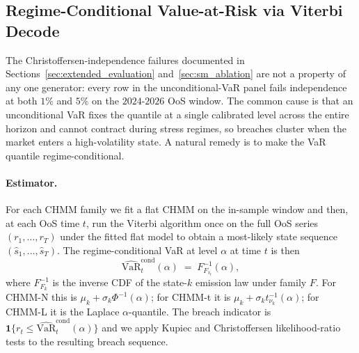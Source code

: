 \subsection{Regime-Conditional Value-at-Risk via Viterbi Decode}
\label{sec:conditional_var}

The Christoffersen-independence failures documented in Sections~\ref{sec:extended_evaluation} and~\ref{sec:sm_ablation} are not a property of any one generator: every row in the unconditional-VaR panel fails independence at both $1\%$ and $5\%$ on the $2024$-$2026$ OoS window.
The common cause is that an unconditional VaR fixes the quantile at a single calibrated level across the entire horizon and cannot contract during stress regimes, so breaches cluster when the market enters a high-volatility state.
A natural remedy is to make the VaR quantile regime-conditional.

\paragraph{Estimator.}
For each CHMM family we fit a flat CHMM on the in-sample window and then, at each OoS time $t$, run the Viterbi algorithm once on the full OoS series $(r_1, \ldots, r_T)$ under the fitted flat model to obtain a most-likely state sequence $(\hat{s}_1, \ldots, \hat{s}_T)$.
The regime-conditional VaR at level $\alpha$ at time $t$ is then
\begin{equation}
\widehat{\mathrm{VaR}}^{\mathrm{cond}}_{t}(\alpha) \;=\; F^{-1}_{F_{\hat{s}_t}}(\alpha),
\label{eq:conditional_var}
\end{equation}
where $F^{-1}_{F_k}$ is the inverse CDF of the state-$k$ emission law under family $F$.
For CHMM-N this is $\mu_k + \sigma_k \Phi^{-1}(\alpha)$; for CHMM-t it is $\mu_k + \sigma_k t^{-1}_{\nu_k}(\alpha)$; for CHMM-L it is the Laplace $\alpha$-quantile.
The breach indicator is $\mathbf{1}\{r_t \le \widehat{\mathrm{VaR}}^{\mathrm{cond}}_{t}(\alpha)\}$ and we apply Kupiec and Christoffersen likelihood-ratio tests to the resulting breach sequence.

